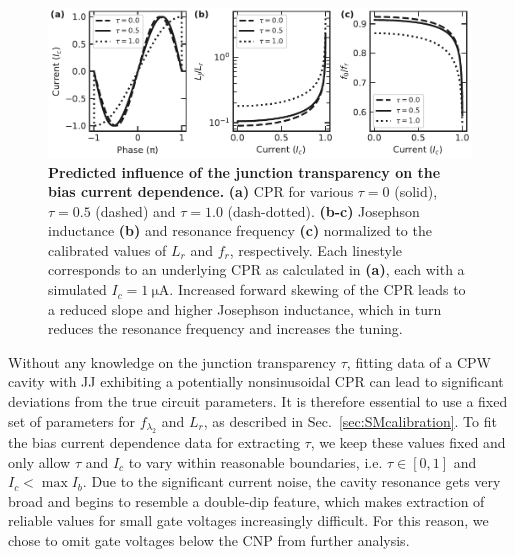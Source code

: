 \begin{figure}
	\centering
	\includegraphics[width=\linewidth]{chapter-gJJ-CPR/figs/SMFigure-influence}
	\caption{
		\textbf{Predicted influence of the junction transparency on the bias current dependence.}
		\textbf{(a)} CPR for various $\tau=0$ (solid), $\tau=0.5$ (dashed) and $\tau=1.0$	(dash-dotted).
		\textbf{(b-c)} Josephson inductance \textbf{(b)} and resonance frequency \textbf{(c)} normalized to the calibrated values of $L_r$ and $f_r$, respectively.
		Each linestyle corresponds to an underlying CPR as calculated in \textbf{(a)}, each with a simulated $I_c=\SI{1}{\micro\ampere}$.
		Increased forward skewing of the CPR leads to a reduced slope and higher Josephson inductance, which in turn reduces the resonance frequency and increases the tuning.
	}
	\label{fig:SMinfluence}
\end{figure}

Without any knowledge on the junction transparency $\tau$, fitting data of a CPW cavity with JJ exhibiting a potentially nonsinusoidal CPR can lead to significant deviations from the true circuit parameters.
%
It is therefore essential to use a fixed set of parameters for $f_{\lambda_2}$ and $L_r$, as described in Sec.~\ref{sec:SMcalibration}.
%
To fit the bias current dependence data for extracting $\tau$, we keep these values fixed and only allow $\tau$ and $I_c$ to vary within reasonable boundaries, i.e. $\tau\in[0,1]$ and $I_c<\max I_b$.
%
Due to the significant current noise, the cavity resonance gets very broad and begins to resemble a double-dip feature, which makes extraction of reliable values for small gate voltages increasingly difficult.
%
For this reason, we chose to omit gate voltages below the CNP from further analysis.




